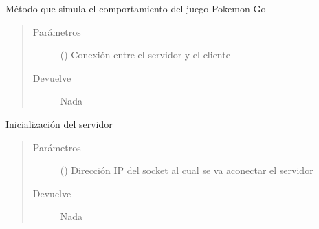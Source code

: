 \documentclass[letterpaper,10pt,spanish,openany,oneside]{sphinxmanual}
\begin{document}
\begin{fulllineitems}
\label{\detokenize{pokemonServer:pokemonServer.playPokemonGo}}
Método que simula el comportamiento del juego Pokemon Go
\begin{quote}\begin{description}
\item[{Parámetros}] \leavevmode
{} () \textendash{} Conexión entre el servidor y el cliente

\item[{Devuelve}] \leavevmode
Nada

\end{description}\end{quote}

\end{fulllineitems}


\begin{fulllineitems}
\label{\detokenize{pokemonServer:pokemonServer.start_server}}
Inicialización del servidor
\begin{quote}\begin{description}
\item[{Parámetros}] \leavevmode
{} () \textendash{} Dirección IP del socket al cual se va aconectar el servidor

\item[{Devuelve}] \leavevmode
Nada

\end{description}\end{quote}

\end{fulllineitems}



\renewcommand{\indexname}{Índice de Módulos Python}
\begin{sphinxtheindex}
\let\bigletter\sphinxstyleindexlettergroup
\bigletter{p}
\item\relax{}
\item\relax{}
\end{sphinxtheindex}

\renewcommand{\indexname}{Índice}
\printindex
\end{document}
